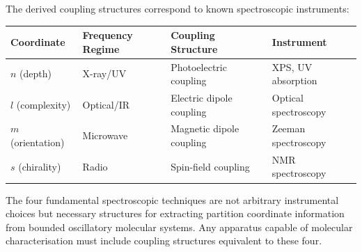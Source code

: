 The derived coupling structures correspond to known spectroscopic instruments:

\begin{center}
\begin{tabular}{llll}
\toprule
\textbf{Coordinate} & \textbf{Frequency Regime} & \textbf{Coupling Structure} & \textbf{Instrument} \\
\midrule
$n$ (depth) & X-ray/UV & Photoelectric coupling & XPS, UV absorption \\
$l$ (complexity) & Optical/IR & Electric dipole coupling & Optical spectroscopy \\
$m$ (orientation) & Microwave & Magnetic dipole coupling & Zeeman spectroscopy \\
$s$ (chirality) & Radio & Spin-field coupling & NMR spectroscopy \\
\bottomrule
\end{tabular}
\end{center}

The four fundamental spectroscopic techniques are not arbitrary instrumental choices but necessary structures for extracting partition coordinate information from bounded oscillatory molecular systems. Any apparatus capable of molecular characterisation must include coupling structures equivalent to these four.
